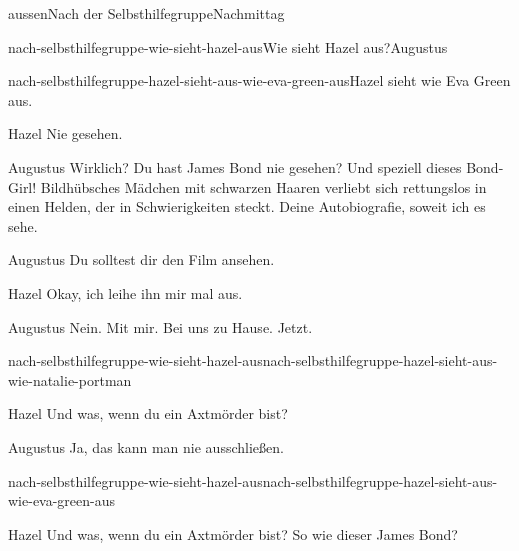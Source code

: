 \documentclass[12pt]{article}
\begin{document}
\begin{scene}[cut to]{aussen}{Nach der Selbsthilfegruppe}{Nachmittag}
\begin{decision}{nach-selbsthilfegruppe-wie-sieht-hazel-aus}{Wie sieht \gls{Hazel} aus?}{\gls{Augustus}}
\begin{option}{nach-selbsthilfegruppe-hazel-sieht-aus-wie-eva-green-aus}{\gls{Hazel} sieht wie Eva Green aus.}
                \begin{dialog}{Hazel}
                    Nie gesehen.
                \end{dialog}

                \begin{dialog}{Augustus}
                    Wirklich?
                    Du hast James Bond nie gesehen?
                    Und speziell dieses Bond-Girl!
                    Bildhübsches Mädchen mit schwarzen Haaren verliebt sich rettungslos in einen Helden, der in Schwierigkeiten steckt.
                    Deine Autobiografie, soweit ich es sehe.
                \end{dialog}
            \end{option}
        \end{decision}

        \begin{dialog}{Augustus}
            Du solltest dir den Film ansehen.
        \end{dialog}

        \begin{dialog}{Hazel}
            Okay, ich leihe ihn mir mal aus.
        \end{dialog}

        \begin{dialog}{Augustus}
            Nein.
            Mit mir.
            Bei uns zu Hause.
            Jetzt.
        \end{dialog}

        \begin{conditional}{nach-selbsthilfegruppe-wie-sieht-hazel-aus}{nach-selbsthilfegruppe-hazel-sieht-aus-wie-natalie-portman}
            \begin{dialog}{Hazel}
                Und was, wenn du ein Axtmörder bist?
            \end{dialog}

            \begin{dialog}{Augustus}
                Ja, das kann man nie ausschließen.
            \end{dialog}
        \end{conditional}

        \begin{conditional}{nach-selbsthilfegruppe-wie-sieht-hazel-aus}{nach-selbsthilfegruppe-hazel-sieht-aus-wie-eva-green-aus}
            \begin{dialog}{Hazel}
                Und was, wenn du ein Axtmörder bist?
                So wie dieser James Bond?
            \end{dialog}


\end{conditional}
\end{scene}
\end{document}
